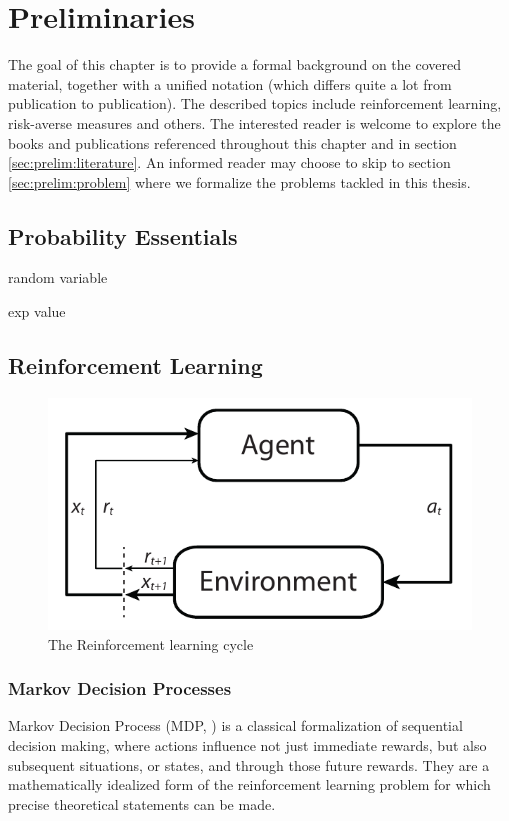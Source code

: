\chapter{Preliminaries}\label{ch:prelim}

The goal of this chapter is to provide a formal background on the covered material, together with a unified notation (which differs quite a lot from publication to publication). The described topics include reinforcement learning, risk-averse measures and others. The interested reader is welcome to explore the books and publications referenced throughout this chapter and in section \ref{sec:prelim:literature}. An informed reader may choose to skip to section \ref{sec:prelim:problem} where we formalize the problems tackled in this thesis.

\section{Probability Essentials}

random variable

exp value




\section{Reinforcement Learning}\label{sec:prelim:rl}


\begin{figure}[h]
\center
\includegraphics[width=.5\linewidth]{gfx/rl_loop.pdf}
\caption{The Reinforcement learning cycle}
\end{figure}

\subsection{Markov Decision Processes}

Markov Decision Process (MDP, \citet{bellman1957markovian}) is a classical formalization of sequential decision making, where actions influence not just immediate rewards, but also subsequent situations, or states, and through those future rewards. They are a mathematically idealized form of the reinforcement learning problem for which precise theoretical statements can be made.

